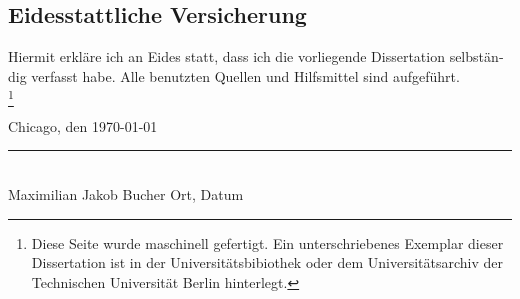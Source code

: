 %
\newcommand\blfootnote[1]{%
	\begingroup
	\renewcommand\thefootnote{}\footnote{#1}
	\addtocounter{footnote}{-1}
	\endgroup
	}
%
%
%
\begin{otherlanguage}{german}
%
\chapter{Eidesstattliche Versicherung}
Hiermit erkläre ich an Eides statt, dass ich die vorliegende Dissertation selbständig verfasst habe. Alle benutzten Quellen und Hilfsmittel sind aufgeführt.\\

\blfootnote{Diese Seite wurde maschinell gefertigt. Ein unterschriebenes Exemplar dieser Dissertation ist in der Universitätsbibiothek oder dem Universitätsarchiv der Technischen Universität Berlin hinterlegt.}
%
\hspace{8cm}Chicago, den \today\\
\hspace{2.5cm}\rule{15cm}{0.4pt}\\
\hspace{2.5cm}Maximilian Jakob Bucher
\hspace{8cm}Ort, Datum\\
%
\end{otherlanguage}